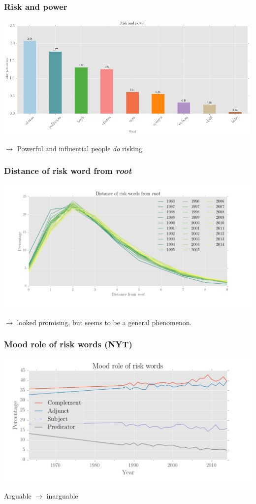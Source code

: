 \documentclass{beamer}       %
\begin{document}
\begin{frame}
    \frametitle{Risk and power}
    \centering
    \includegraphics[width=0.99\textwidth]{../../images/risk-and-power-2}

    $\rightarrow$ Powerful and influential people \emph{do} risking

\end{frame}

\begin{frame}
    \frametitle{Distance of risk word from \emph{root}}
    \centering
    \includegraphics[width=1\textwidth]{../../images/distance-of-risk-words-from-root}

    $\rightarrow$ looked promising, but seems to be a general phenomenon.
\end{frame}

\begin{frame}
    \frametitle{Mood role of risk words (NYT)}
    \centering
    \includegraphics[width=1\textwidth]{../../images/mood-role-of-risk-words}

    Arguable $\rightarrow$ inarguable
\end{frame}
\end{document}
